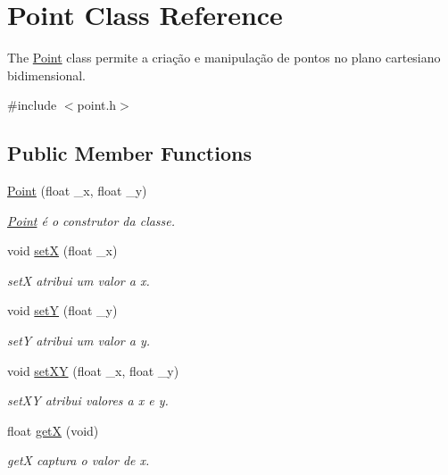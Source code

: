 \hypertarget{class_point}{}\section{Point Class Reference}
\label{class_point}


The \mbox{\hyperlink{class_point}{Point}} class permite a criação e manipulação de pontos no plano cartesiano bidimensional.  




{\ttfamily \#include $<$point.\+h$>$}

\subsection*{Public Member Functions}
\begin{DoxyCompactItemize}
\item 
\mbox{\hyperlink{class_point_a6524332fa4d321ff0a001366a732c7b6}{Point}} (float \+\_\+x, float \+\_\+y)
\begin{DoxyCompactList}\small\item\em \mbox{\hyperlink{class_point}{Point}} é o construtor da classe. \end{DoxyCompactList}\item 
void \mbox{\hyperlink{class_point_a428a1676e2fdec6753c42011a1d59d18}{setX}} (float \+\_\+x)
\begin{DoxyCompactList}\small\item\em setX atribui um valor a x. \end{DoxyCompactList}\item 
void \mbox{\hyperlink{class_point_a9868c4601b0ea0c2d0de20fe41ee0e49}{setY}} (float \+\_\+y)
\begin{DoxyCompactList}\small\item\em setY atribui um valor a y. \end{DoxyCompactList}\item 
void \mbox{\hyperlink{class_point_ab5385c6d9bfa841e641e4709fc9f14cc}{set\+XY}} (float \+\_\+x, float \+\_\+y)
\begin{DoxyCompactList}\small\item\em set\+XY atribui valores a x e y. \end{DoxyCompactList}\item 
float \mbox{\hyperlink{class_point_a9aa94b8fd07296e64d304ef3750db113}{getX}} (void)
\begin{DoxyCompactList}\small\item\em getX captura o valor de x. \end{DoxyCompactList}\item 

\end{DoxyCompactItemize}
